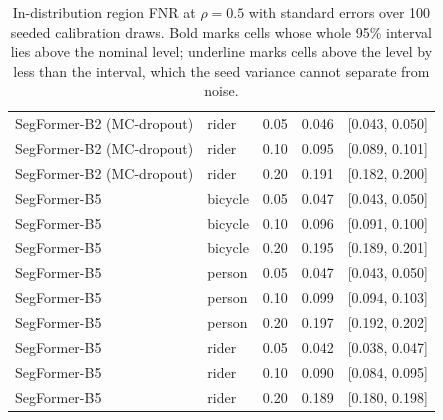 \begin{table}[t]
\begin{tabular}{llccc}
SegFormer-B2 (MC-dropout) & rider & 0.05 & 0.046 & [0.043, 0.050] \\
SegFormer-B2 (MC-dropout) & rider & 0.10 & 0.095 & [0.089, 0.101] \\
SegFormer-B2 (MC-dropout) & rider & 0.20 & 0.191 & [0.182, 0.200] \\
SegFormer-B5 & bicycle & 0.05 & 0.047 & [0.043, 0.050] \\
SegFormer-B5 & bicycle & 0.10 & 0.096 & [0.091, 0.100] \\
SegFormer-B5 & bicycle & 0.20 & 0.195 & [0.189, 0.201] \\
SegFormer-B5 & person & 0.05 & 0.047 & [0.043, 0.050] \\
SegFormer-B5 & person & 0.10 & 0.099 & [0.094, 0.103] \\
SegFormer-B5 & person & 0.20 & 0.197 & [0.192, 0.202] \\
SegFormer-B5 & rider & 0.05 & 0.042 & [0.038, 0.047] \\
SegFormer-B5 & rider & 0.10 & 0.090 & [0.084, 0.095] \\
SegFormer-B5 & rider & 0.20 & 0.189 & [0.180, 0.198] \\
\bottomrule
\end{tabular}
\caption{In-distribution region FNR at $\rho=0.5$ with standard errors over 100 seeded calibration draws. Bold marks cells whose whole 95\% interval lies above the nominal level; underline marks cells above the level by less than the interval, which the seed variance cannot separate from noise.}
\label{tab:uncertainty_indist}
\end{table}
